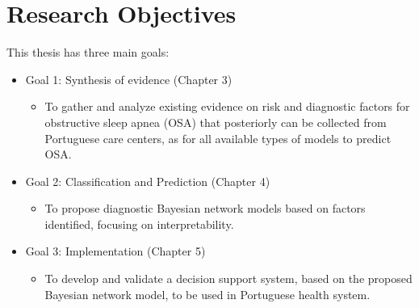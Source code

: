 \section{Research Objectives}
This thesis has three main goals:
\begin{itemize}

    \item Goal 1: Synthesis of evidence (Chapter 3) %
    \begin{itemize}
        \item  To gather and analyze existing evidence on risk and diagnostic factors for obstructive sleep apnea
(OSA) that posteriorly can be collected from Portuguese care centers, as for all available types of models to predict OSA.
    \end{itemize}


    \item Goal 2: Classification and Prediction (Chapter 4)
        \begin{itemize}
        \item  To propose diagnostic Bayesian network models based on factors identified, focusing on
interpretability.
    \end{itemize}


    \item Goal 3: Implementation (Chapter 5)
            \begin{itemize}
        \item  To develop and validate a decision support system, based on the proposed Bayesian network
model, to be used in Portuguese health system.
    \end{itemize}




\end{itemize}